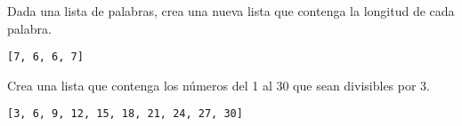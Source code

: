 \begin{exercise} Dada una lista de palabras, crea una nueva lista que contenga la longitud de cada palabra.

\begin{Shaded}
\begin{Highlighting}[]
\OperatorTok{=}\NormalTok{ [}\NormalTok{, }\NormalTok{, }\NormalTok{, }\NormalTok{]}
\OperatorTok{=}\NormalTok{ [}\NormalTok{ palabras]}
\end{Highlighting}
\end{Shaded}

\begin{verbatim}
[7, 6, 6, 7]

\end{verbatim}
\end{exercise}

\begin{exercise} Crea una lista que contenga los números del 1 al 30 que sean divisibles por 3.

\begin{Shaded}
\begin{Highlighting}[]
\OperatorTok{=}\NormalTok{ [x } \NormalTok{(}\NormalTok{, }\NormalTok{) }\OperatorTok{\%}  \OperatorTok{==} \NormalTok{]}
\end{Highlighting}
\end{Shaded}

\begin{verbatim}
[3, 6, 9, 12, 15, 18, 21, 24, 27, 30]

\end{verbatim}
\end{exercise}


